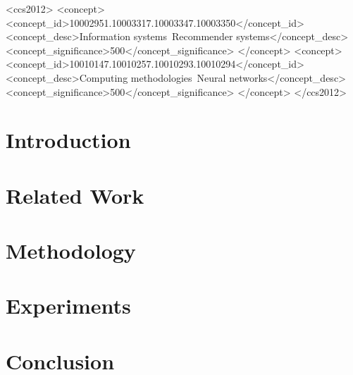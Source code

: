 \documentclass[sigconf]{acmart}
\begin{document}
\begin{CCSXML}
<ccs2012>
<concept>
<concept_id>10002951.10003317.10003347.10003350</concept_id>
<concept_desc>Information systems~Recommender systems</concept_desc>
<concept_significance>500</concept_significance>
</concept>
<concept>
<concept_id>10010147.10010257.10010293.10010294</concept_id>
<concept_desc>Computing methodologies~Neural networks</concept_desc>
<concept_significance>500</concept_significance>
</concept>
</ccs2012>
\end{CCSXML}



\maketitle

\section{Introduction}\label{sec:intro}


\section{Related Work} \label{sec:related}


\section{Methodology}\label{sec:model}


\section{Experiments}\label{sec:exp}


\section{Conclusion} \label{sec:conclusion}

\end{document}
